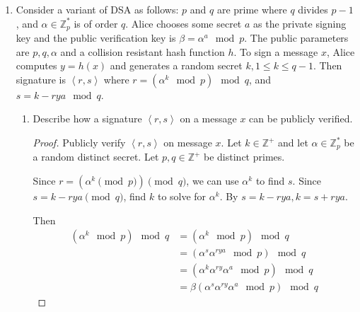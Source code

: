\documentclass{article}
\begin{document}
\begin{enumerate}
\begin{enumerate}
        \begin{proof}
          Suppose that the RSA problem is hard. Then RSA cannot be solved in
          polynomial time. Consider an experiment in which an attacker
          $\mathcal{A}$ is given a public key $\left<N, e\right>$ and uniform $m
          \in \mathbb{Z}^{*}_N$. Since RSA cannot be solved in polynomial time,
          $\mathcal{A}$ must make some queries to the
          $\textsf{Sign}_{sk}(\cdot)$ oracle to create a $(m, \gamma)$ pair to
          forge. This information is provided to the oracle, implies that $m \in
          \mathcal{M}$ and $\mathcal{A}$ cannot provide $m$ as output in the
          experiment. Furthermore, $\mathcal{A}$ cannot bear RSA by chance
          (since we supposed RSA is hard). Since $\mathcal{A}$ cannot succeed,
          the plain RSA scheme satisfies the weak definition of security.
        \end{proof}
    \end{enumerate}
  \item Consider a variant of DSA as follows: $p$ and $q$ are prime where $q$
    divides $p - 1$, and $\alpha \in \mathbb{Z}^{*}_p$ is of order $q$. Alice chooses
    some secret $a$ as the private signing key and the public verification key
    is $\beta = \alpha^a \mod p$. The public parameters are $p, q, \alpha$ and a
    collision resistant hash function $h$. To sign a message $x$, Alice computes
    $y = h(x)$ and generates a random secret $k, 1 \leq k \leq q - 1$. Then
    signature is $\left<r, s\right>$ where $r = (\alpha^k \mod p) \mod q$, and
    $s = k - rya \mod q$.
    \begin{enumerate}
      \item Describe how a signature $\left<r, s\right>$ on a message $x$ can be
        publicly verified.

        \begin{proof}
          Publicly verify $\left<r, s\right>$ on message $x$. Let $k \in
          \mathbb{Z}^{+}$ and let $\alpha \in \mathbb{Z}_p^{*}$ be a random
          distinct secret. Let $p, q \in \mathbb{Z}^{+}$ be distinct primes.

          Since $r = (\alpha^k \pmod{p}) \pmod {q}$, we can use $\alpha^k$ to
          find $s$. Since $s = k - rya \pmod{q}$, find $k$ to solve for
          $\alpha^k$. By $s = k - rya, k = s + rya$.

          Then
          \begin{align*}
            (\alpha^k \mod{p}) \mod q &= (\alpha^k \mod{p}) \mod{q}\\
                                &= (\alpha^s \alpha^{rya} \mod{p}) \mod{q}\\
                                &= (\alpha^k \alpha^{ry} \alpha^a \mod{p}) \mod{q}\\
                                &= \beta (\alpha^s \alpha^{ry} \alpha^a \mod{p}) \mod{q}
          \end{align*}


\end{proof}
\end{enumerate}
\end{enumerate}
\end{document}
